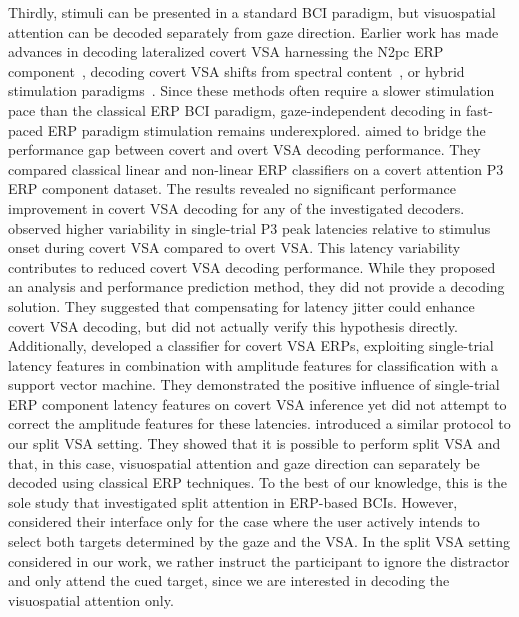 Thirdly, stimuli can be presented in a standard BCI paradigm, but visuospatial attention
can be decoded separately from gaze direction.
Earlier work has made advances in decoding lateralized covert
VSA harnessing the N2pc ERP component~\cite{Thiery2016,Reichert2020b,Wang2022},
decoding covert VSA shifts from spectral content~\cite{Tonin2013}, or hybrid
stimulation paradigms~\cite{Egan2017}.
Since these methods often require a slower stimulation pace than the classical
ERP BCI paradigm, gaze-independent decoding in fast-paced ERP paradigm stimulation
remains underexplored.
\cite{Aloise2012b} aimed to bridge the performance gap between covert and
overt VSA decoding performance.
They compared classical linear and non-linear ERP classifiers on a covert
attention P3 ERP component dataset.
The results revealed no significant performance improvement in covert VSA
decoding for any of the investigated decoders.
\cite{Arico2014} observed higher variability in single-trial P3 peak
latencies relative to stimulus onset during covert VSA compared to overt VSA.
This latency variability contributes to reduced covert VSA decoding performance.
While they proposed an analysis and performance prediction method, they did not provide a
decoding solution.
They suggested that compensating for latency jitter could enhance covert VSA
decoding, but did not actually verify this hypothesis directly.
Additionally, \cite{hardiansyah2020single} developed a classifier for
covert VSA ERPs, exploiting single-trial latency features in combination with
amplitude features for classification with a support vector machine.
They demonstrated the positive influence of single-trial ERP component latency
features on covert VSA inference yet did not attempt to correct the amplitude
features for these latencies.
\cite{Frenzel2011} introduced a similar protocol to our split VSA
setting.
They showed that it is possible to perform split VSA and that, in this
case, visuospatial attention and gaze direction can separately be decoded using
classical ERP techniques.
To the best of our
knowledge, this is the sole study that investigated split attention in ERP-based BCIs.
However, \cite{Frenzel2011} considered their interface only for the case
where the user actively intends to select both targets determined by the gaze
and the VSA.
In the split VSA setting considered in our work, we rather instruct the participant to ignore
the distractor and only attend the cued target, since we are interested in
decoding the visuospatial attention only.

